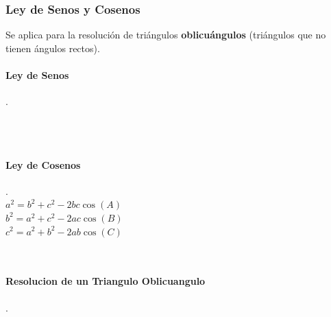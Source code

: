 \documentclass[stu, 12pt, letterpaper, donotrepeattitle, floatsintext, natbib]{apa7}
\begin{document}
    \subsubsection{Ley de Senos y Cosenos}
    Se aplica para la resolución de triángulos \textbf{oblicuángulos} (triángulos que no tienen ángulos rectos).\\[0.5cm]

    \begin{paracol}{2}
        \paragraph{Ley de Senos}.\\[0.5cm]
        \\[0.5cm]
        \\[0.5cm]
        \switchcolumn

        \paragraph{Ley de Cosenos}.\\[0.5cm]
        $a^2=b^2+c^2-2bc\cos(A)$\\
        $b^2=a^2+c^2-2ac\cos(B)$\\
        $c^2=a^2+b^2-2ab\cos(C)$\\

    \end{paracol}\\[1cm]

    \paragraph{Resolucion de un Triangulo Oblicuangulo}.\\[0.5cm]
\end{document}
